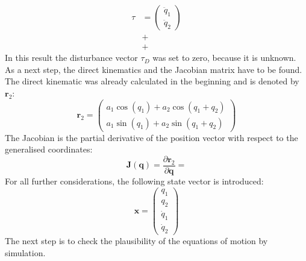 \begin{align*}
	\tau &= \left(\begin{array}{c}
	\ddot{q}_1\\ \ddot{q}_2
	\end{array}\right) \\
	 &+ \\
	 &+ 
\end{align*}
In this result the disturbance vector $\tau_D$ was set to zero, because it is unknown.\\
As a next step, the direct kinematics and the Jacobian matrix have to be found. The direct kinematic was already calculated in the beginning and is denoted by $\mathbf{r}_2$:
\begin{equation*}
	\mathbf{r}_2 = \left(\begin{array}{c}
	a_1\cos(q_1) + a_2\cos(q_1+q_2)\\
	a_1\sin(q_1) + a_2\sin(q_1+q_2)
	\end{array}\right)
\end{equation*}
The Jacobian is the partial derivative of the position vector with respect to the generalised coordinates:
\begin{equation*}
	\mathbf{J}(\mathbf{q}) = \frac{\partial \mathbf{r}_2}{\partial \mathbf{q}} = 
\end{equation*}
For all further considerations, the following state vector is introduced:
\begin{equation*}
	\mathbf{x}=\left(\begin{array}{c}
q_1\\ q_2 \\ \dot{q}_1 \\ \dot{q}_2
\end{array}\right)
\end{equation*}
The next step is to check the plausibility of the equations of motion by simulation.
